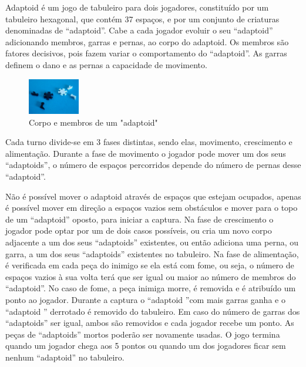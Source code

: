\documentclass[a4paper]{article}
\begin{document}
Adaptoid é um jogo de tabuleiro para dois jogadores, constituído por um tabuleiro hexagonal, que contém 37 espaços, e por um conjunto de criaturas denominadas de “adaptoid”. Cabe a cada jogador evoluir o seu “adaptoid” adicionando membros, garras e pernas, ao corpo do adaptoid. Os membros são fatores decisivos, pois fazem variar o comportamento do “adaptoid”. As garras definem o dano e as pernas a capacidade de movimento.

\begin{figure}
    	\centering
	\vspace{-10pt}
   	\includegraphics[width=0.20\textwidth]{adaptoidsDissecados}
    	\caption{Corpo e membros de um "adaptoid"}
\end{figure}

Cada turno divide-se em 3 fases distintas, sendo elas, movimento, crescimento e alimentação. Durante a fase de movimento o jogador pode mover um dos seus “adaptoids”, o número de espaços percorridos depende do número de pernas desse “adaptoid”.

Não é possível mover o adaptoid através de espaços que estejam ocupados, apenas é possível mover em direção a espaços vazios sem obstáculos e mover para o topo de um “adaptoid” oposto, para iniciar a captura. Na fase de crescimento o jogador pode optar por um de dois casos possíveis, ou cria um novo corpo adjacente a um dos seus “adaptoids” existentes, ou então adiciona uma perna, ou garra, a um dos seus “adaptoids” existentes no tabuleiro. Na fase de alimentação, é verificada em cada peça do inimigo se ela está com fome, ou seja, o número  de espaços vazios à sua volta terá que ser igual ou maior ao número de membros do “adaptoid”. No caso de fome, a peça inimiga morre, é removida e é atribuído um ponto ao jogador. Durante a captura o “adaptoid ”com mais garras ganha e o “adaptoid ” derrotado é removido do tabuleiro. Em caso do número de garras dos “adaptoids” ser igual, ambos são removidos e cada jogador recebe um ponto. As peças de “adaptoids” mortos poderão ser novamente usadas. O jogo termina quando um jogador chega aos 5 pontos ou quando um dos jogadores ficar sem nenhum “adaptoid” no tabuleiro.
\end{document}
